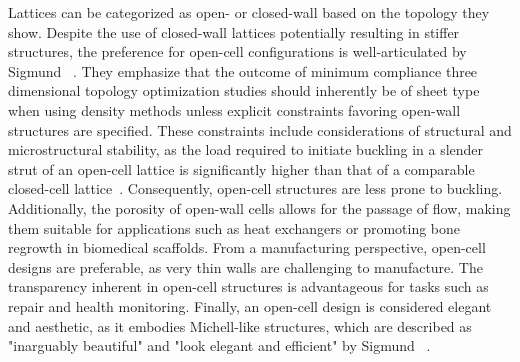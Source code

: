 Lattices can be categorized as open- or closed-wall based on the topology they show. Despite the use of closed-wall lattices potentially resulting in stiffer structures, the preference for open-cell configurations is well-articulated by Sigmund \etal~. They emphasize that the outcome of minimum compliance three dimensional topology optimization studies should inherently be of sheet type when using density methods unless explicit constraints favoring open-wall structures are specified. These constraints include considerations of structural and microstructural stability, as the load required to initiate buckling in a slender strut of an open-cell lattice is significantly higher than that of a comparable closed-cell lattice~. Consequently, open-cell structures are less prone to buckling. Additionally, the porosity of open-wall cells allows for the passage of flow, making them suitable for applications such as heat exchangers or promoting bone regrowth in biomedical scaffolds. From a manufacturing perspective, open-cell designs are preferable, as very thin walls are challenging to manufacture. The transparency inherent in open-cell structures is advantageous for tasks such as repair and health monitoring. Finally, an open-cell design is considered elegant and aesthetic, as it embodies Michell-like structures, which are described as "inarguably beautiful" and "look elegant and efficient" by Sigmund \etal~\cite{sigmund_non-optimality_2016}.
